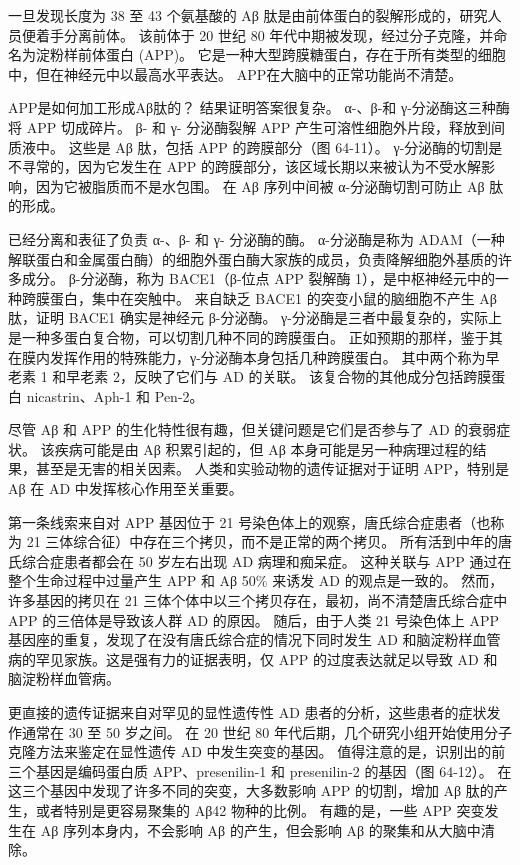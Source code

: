 一旦发现长度为 38 至 43 个氨基酸的 Aβ 肽是由前体蛋白的裂解形成的，研究人员便着手分离前体。 该前体于 20 世纪 80 年代中期被发现，经过分子克隆，并命名为淀粉样前体蛋白 (APP)。 它是一种大型跨膜糖蛋白，存在于所有类型的细胞中，但在神经元中以最高水平表达。 APP在大脑中的正常功能尚不清楚。

APP是如何加工形成Aβ肽的？ 结果证明答案很复杂。 α-、β-和 γ-分泌酶这三种酶将 APP 切成碎片。 β- 和 γ- 分泌酶裂解 APP 产生可溶性细胞外片段，释放到间质液中。 这些是 Aβ 肽，包括 APP 的跨膜部分（图 64-11）。 γ-分泌酶的切割是不寻常的，因为它发生在 APP 的跨膜部分，该区域长期以来被认为不受水解影响，因为它被脂质而不是水包围。 在 Aβ 序列中间被 α-分泌酶切割可防止 Aβ 肽的形成。

已经分离和表征了负责 α-、β- 和 γ- 分泌酶的酶。 α-分泌酶是称为 ADAM（一种解联蛋白和金属蛋白酶）的细胞外蛋白酶大家族的成员，负责降解细胞外基质的许多成分。 β-分泌酶，称为 BACE1（β-位点 APP 裂解酶 1），是中枢神经元中的一种跨膜蛋白，集中在突触中。 来自缺乏 BACE1 的突变小鼠的脑细胞不产生 Aβ 肽，证明 BACE1 确实是神经元 β-分泌酶。 γ-分泌酶是三者中最复杂的，实际上是一种多蛋白复合物，可以切割几种不同的跨膜蛋白。 正如预期的那样，鉴于其在膜内发挥作用的特殊能力，γ-分泌酶本身包括几种跨膜蛋白。 其中两个称为早老素 1 和早老素 2，反映了它们与 AD 的关联。 该复合物的其他成分包括跨膜蛋白 nicastrin、Aph-1 和 Pen-2。

尽管 Aβ 和 APP 的生化特性很有趣，但关键问题是它们是否参与了 AD 的衰弱症状。 该疾病可能是由 Aβ 积累引起的，但 Aβ 本身可能是另一种病理过程的结果，甚至是无害的相关因素。 人类和实验动物的遗传证据对于证明 APP，特别是 Aβ 在 AD 中发挥核心作用至关重要。

第一条线索来自对 APP 基因位于 21 号染色体上的观察，唐氏综合症患者（也称为 21 三体综合征）中存在三个拷贝，而不是正常的两个拷贝。 所有活到中年的唐氏综合症患者都会在 50 岁左右出现 AD 病理和痴呆症。 这种关联与 APP 通过在整个生命过程中过量产生 APP 和 Aβ 50\% 来诱发 AD 的观点是一致的。 然而，许多基因的拷贝在 21 三体个体中以三个拷贝存在，最初，尚不清楚唐氏综合症中 APP 的三倍体是导致该人群 AD 的原因。 随后，由于人类 21 号染色体上 APP 基因座的重复，发现了在没有唐氏综合症的情况下同时发生 AD 和脑淀粉样血管病的罕见家族。这是强有力的证据表明，仅 APP 的过度表达就足以导致 AD 和 脑淀粉样血管病。

更直接的遗传证据来自对罕见的显性遗传性 AD 患者的分析，这些患者的症状发作通常在 30 至 50 岁之间。 在 20 世纪 80 年代后期，几个研究小组开始使用分子克隆方法来鉴定在显性遗传 AD 中发生突变的基因。 值得注意的是，识别出的前三个基因是编码蛋白质 APP、presenilin-1 和 presenilin-2 的基因（图 64-12）。 在这三个基因中发现了许多不同的突变，大多数影响 APP 的切割，增加 Aβ 肽的产生，或者特别是更容易聚集的 Aβ42 物种的比例。 有趣的是，一些 APP 突变发生在 Aβ 序列本身内，不会影响 Aβ 的产生，但会影响 Aβ 的聚集和从大脑中清除。

